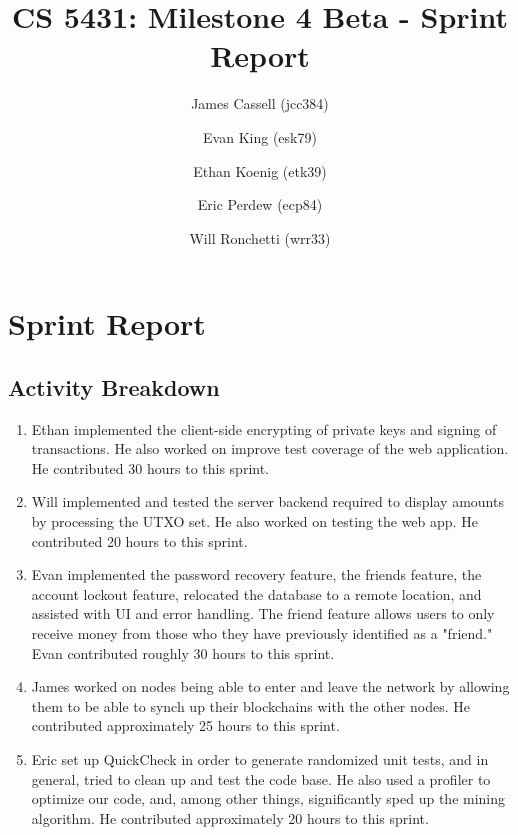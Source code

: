 \documentclass[a4paper,12pt]{article}
\title{CS 5431: Milestone 4 Beta - Sprint Report}
\author{
James Cassell (jcc384)
\and
Evan King (esk79)
\and
Ethan Koenig (etk39)
\and
Eric Perdew (ecp84)
\and
Will Ronchetti (wrr33)
}
\begin{document}
\maketitle

\section{Sprint Report}

\subsection{Activity Breakdown}

\begin{enumerate}
\item Ethan implemented the client-side encrypting of private keys and signing of transactions. He also worked on improve test coverage of the web application. He contributed 30 hours to this sprint.
\item Will implemented and tested the server backend required to display amounts by processing the UTXO set. He also worked on testing the web app. He contributed 20 hours to this sprint. 
\item Evan implemented the password recovery feature, the friends feature, the account lockout feature, relocated the database to a remote location, and assisted with UI and error handling. The friend feature allows users to only receive money from those who they have previously identified as a "friend." Evan contributed roughly 30 hours to this sprint.
\item James worked on nodes being able to enter and leave the network by allowing them to be able to synch up their blockchains with the other nodes.
He contributed approximately 25 hours to this sprint.
\item  Eric set up QuickCheck in order to generate randomized unit tests, and in general, tried to clean up and test the code base. He also used a profiler to optimize our code, and, among other things, significantly sped up the mining algorithm. He contributed approximately 20 hours to this sprint.
\end{enumerate}
\end{document}
